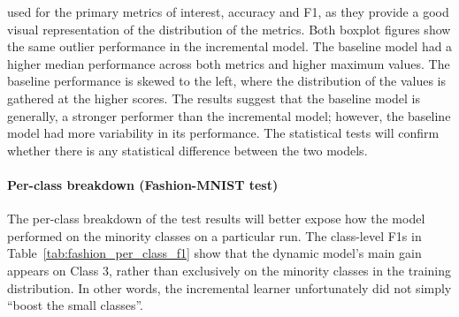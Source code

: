 \documentclass[conference]{IEEEtran}
\begin{document}
used for the primary metrics of interest, accuracy and F1, as they provide a good visual representation of the distribution of the metrics.
Both boxplot figures show the same outlier performance in the incremental model. The baseline model had a higher median 
performance across both metrics and higher maximum values. The baseline performance is skewed to the left, where the 
distribution of the values is gathered at the higher scores. The results suggest that the baseline model is 
generally, a stronger performer than the incremental model; however, the baseline model had more variability in its performance. The statistical tests will confirm whether there 
is any statistical difference between the two models. 


\paragraph{Per-class breakdown (Fashion-MNIST test)}
The per-class breakdown of the test results will better expose how the model performed on the minority classes on a particular run. The 
class-level F1s in Table~\ref{tab:fashion_per_class_f1} show that the dynamic model's main gain appears on Class 3, rather than exclusively on the 
minority classes in the training distribution. In other words, the incremental learner unfortunately did not simply “boost the small classes”. 
\end{document}
